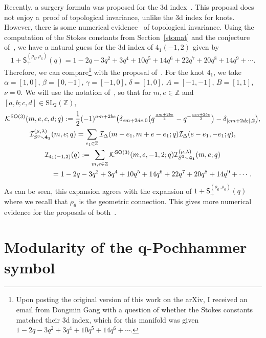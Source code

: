 \documentclass[pdftex]{sigma}
\numberwithin{equation}{section}
\def\BZ{\mathbb{Z}}
\def\SL{\mathrm{SL}}
\def\SL{\mathrm{SL}}
\def\BZ{\mathbb Z}
\def\SL{\mathrm{SL}}
\begin{document}
Recently, a surgery formula was proposed for the 3d index~\cite{Gang3d}. This proposal does not enjoy a~proof of topological invariance, unlike the 3d index for knots. However, there is some numerical evidence~\cite{Gang3d} of topological invariance. Using the computation of the Stokes constants from Section~\ref{stomat} and the conjecture of~\cite[Conjecture 2]{GGM:I}, we have a natural guess for the 3d index of $4_1(-1,2)$ given by
\[
 1+\mathsf{S}_{+}^{(\rho_6,\rho_6)}(q)
  =
 1 - 2q - 3q^2 + 3q^4 + 10q^5 + 14q^6 + 22q^7 + 20q^8 + 14q^9+\cdots .
\]
Therefore, we can compare\footnote{Upon posting the original version of this work on the arXiv, I received an email from Dongmin Gang with a question of whether the Stokes constants matched their 3d index, which for this manifold was given $1-2q -3q^2 +3q^4 +10 q^5+14 q^6+\cdots$.} with the proposal of~\cite{Gang3d}. For the knot $4_1$, we take $\alpha=[1,0]$, $\beta=[0,-1]$, $\gamma=[-1,0]$, $\delta=[1,0]$, $A=[-1,-1]$, $B=[1,1]$, $\nu=0$. We will use the notation of~\cite{Gang3d}, so that for $m,e\in\BZ$ and $[a,b;c,d]\in\SL_{2}(\BZ)$,
\begin{gather*}
 \mathcal{K}^{\mathrm{SO}(3)}(m,e,c,d;q)
  :=
 \frac{1}{2}(-1)^{am+2be}\bigl(\delta_{cm+2de,0}\bigl(q^{\frac{am+2be}{2}}-q^{-\frac{am+2be}{2}}\bigr)-\delta_{|cm+2de|,2}\bigr) ,\\
 \mathcal{I}_{S^{3}\smallsetminus \mathbf{4_1}}^{(\mu,\lambda)}(m,e;q)
 =
 \sum_{e_1\in\BZ}\mathcal{I}_{\Delta}(m-e_1,m+e-e_1;q)\mathcal{I}_{\Delta}(e-e_1,-e_1;q),\\
 \mathcal{I}_{4_{1}(-1,2)}(q)
 :=\sum_{m,e\in\BZ}
 \mathcal{K}^{\mathrm{SO}(3)}(m,e,-1,2;q)\mathcal{I}_{S^{3}\smallsetminus \mathbf{4_1}}^{(\mu,\lambda)}(m,e;q)\\
\hphantom{\mathcal{I}_{4_{1}(-1,2)}(q) \ }{} = 1 - 2q - 3q^2 + 3q^4 + 10q^5 + 14q^6 + 22q^7 + 20q^8  + 14q^9 +\cdots.
\end{gather*}
As can be seen, this expansion agrees with the expansion of $1+\mathsf{S}_{+}^{(\rho_6,\rho_6)}(q)$ where we recall that $\rho_{6}$ is the geometric connection. This gives more numerical evidence for the proposals of both~\cite{Gang3d,GGM:I}.

\appendix

\section{\texorpdfstring{Modularity of the $\boldsymbol{q}$-Pochhammer symbol}{Modularity of the q-Pochhammer symbol}}\label{sec:mod.poch}
\end{document}
